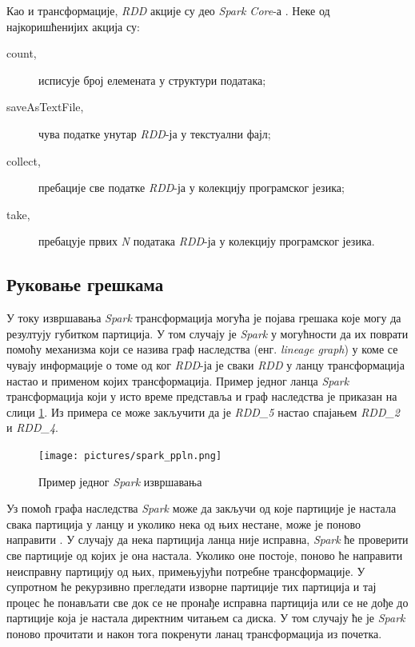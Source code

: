 \documentclass[12pt,oneside]{memoir}
\begin{document}
Као и трансформације, \textit{RDD} акције су део \textit{Spark Core}-а  \cite{spark_rdd_transf}. Неке од најкоришћенијих акција су:

\begin{description}
	\item[count,] исписује број елемената у структури података;
	\item[saveAsTextFile,] чува податке унутар \textit{RDD}-ја у текстуални фајл;
	\item[collect,] пребације све податке \textit{RDD}-ја у колекцију програмског језика;
	\item[take,] пребацује првих \textit{N} података \textit{RDD}-ја у колекцију програмског језика.
\end{description}

\subsection{Руковање грешкама}
\label{subsec:spark_dags}

У току извршавања \textit{Spark} трансформација могућа је појава грешака које могу да резултују губитком партиција. У том случају је \textit{Spark} у могућности да их поврати помоћу механизма који се назива граф наследства (енг. \textit{lineage graph}) у коме се чувају информације о томе од ког \textit{RDD}-ја је сваки \textit{RDD} у ланцу трансформација настао и применом којих трансформација. Пример једног ланца \textit{Spark} трансформација који у исто време представља и граф наследства је приказан на  слици \ref{fig:sprk_ppln}. Из примера се може закључити да је \textit{RDD\_5} настао спајањем \textit{RDD\_2} и \textit{RDD\_4}.

\begin{figure}[!ht]
  \centering
  \texttt{[image: pictures/spark\_ppln.png]}
  \caption{Пример једног \textit{Spark} извршавања}
  \label{fig:sprk_ppln}
\end{figure}

Уз помоћ графа наследства \textit{Spark} може да закључи од које партиције је настала свака партиција у ланцу и уколико нека од њих нестане, може је поново направити \cite{hadoop_learning}. У случају да нека партиција ланца није исправна, \textit{Spark} ће проверити све партиције од којих је она настала. Уколико оне постоје, поново ће направити неисправну партицију од њих, примењујући потребне трансформације. У супротном ће рекурзивно прегледати изворне партиције тих партиција и тај процес ће понављати све док се не пронађе исправна партиција или се не дође до партиције која је настала директним читањем са диска. У том случају ће је \textit{Spark} поново прочитати и након тога покренути ланац трансформација из почетка.
\end{document}
